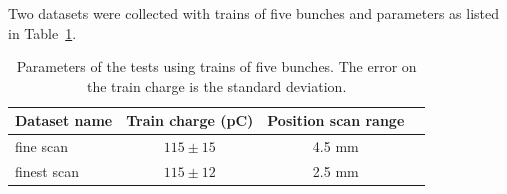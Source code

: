 Two datasets were collected with trains of five bunches and parameters as listed in Table~\ref{tab:5bunch_test_param}.

\begin{table}[!h]
  \centering
    \begin{tabular}{l c c c}
    \toprule
    Dataset name & Train charge (pC) & Position scan range  \\
    \midrule
    fine scan    & $115\pm15$ & 4.5 mm\\
    finest scan  & $115\pm12$ & 2.5 mm\\
    \bottomrule
    \end{tabular}
  \caption{Parameters of the tests using trains of five bunches. The error on the train charge is the standard deviation.} \label{tab:5bunch_test_param}
\end{table}




